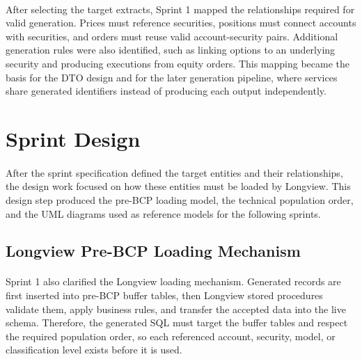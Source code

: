 \paragraph{}After selecting the target extracts, Sprint 1 mapped the relationships required for valid
generation. Prices must reference securities, positions must connect accounts with securities, and
orders must reuse valid account-security pairs. Additional generation rules were also identified, such
as linking options to an underlying security and producing executions from equity orders. This mapping
became the basis for the DTO design and for the later generation pipeline, where services share
generated identifiers instead of producing each output independently.

\section{Sprint Design}

\paragraph{}After the sprint specification defined the target entities and their relationships, the
design work focused on how these entities must be loaded by Longview. This design step produced
the pre-BCP loading model, the technical population order, and the UML diagrams used as reference
models for the following sprints.

\subsection{Longview Pre-BCP Loading Mechanism}

\paragraph{}Sprint 1 also clarified the Longview loading mechanism. Generated records are first
inserted into pre-BCP buffer tables, then Longview stored procedures validate them, apply business
rules, and transfer the accepted data into the live schema. Therefore, the generated SQL must target
the buffer tables and respect the required population order, so each referenced account, security,
model, or classification level exists before it is used.


